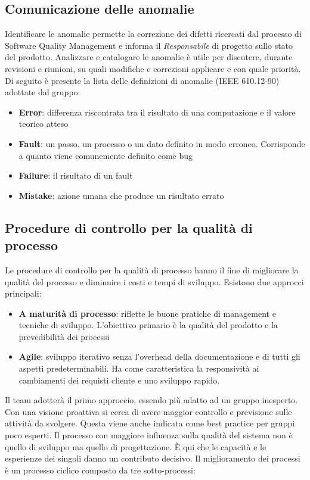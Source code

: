 {  \subsection{Comunicazione delle anomalie}
  Identificare le anomalie permette la correzione dei difetti ricercati
  dal processo di Software Quality  Management e informa il  \emph{Responsabile}
  di  progetto sullo stato del prodotto. Analizzare e
  catalogare le anomalie è utile per discutere, durante revisioni e
  riunioni, su quali modifiche e correzioni applicare e con quale priorità. Di seguito è presente la lista delle definizioni di anomalie
  (IEEE 610.12-90) adottate dal gruppo:
  \begin{itemize}
  \item \textbf{Error}: differenza riscontrata tra il risultato di una computazione e il valore teorico atteso
  \item \textbf{Fault}: un passo, un processo o un dato definito in modo
    erroneo. Corrisponde a quanto viene comunemente definito come bug
  \item \textbf{Failure}: il risultato di un fault
  \item \textbf{Mistake}: azione umana che produce un risultato errato
  \end{itemize}


  \subsection{Procedure di controllo per la qualità di processo}
  Le procedure di controllo per la qualità di processo hanno il fine di migliorare la qualità del
  processo e diminuire i costi e tempi di sviluppo. Esistono due
  approcci principali:
  \begin{itemize}
  \item \textbf{A maturità di processo}: riflette le buone pratiche di management e tecniche di sviluppo.
    L'obiettivo primario è la qualità del prodotto e la prevedibilità dei processi
  \item \textbf{Agile}: sviluppo iterativo senza l’overhead della
    documentazione e di tutti gli aspetti predeterminabili. Ha come
    caratteristica la responsività ai cambiamenti dei requisti cliente e
    uno sviluppo rapido.
  \end{itemize}
  Il team adotterà il primo approccio, essendo più adatto ad un gruppo inesperto. Con una visione
  proattiva si cerca di avere maggior controllo e previsione sulle attività da svolgere. Questa viene
  anche indicata come best practice per gruppi poco esperti.
  Il processo con maggiore influenza sulla qualità del sistema non è quello di sviluppo ma quello
  di progettazione. È qui che le capacità e le esperienze dei singoli danno un contributo decisivo.
  Il miglioramento dei processi è un processo ciclico composto da tre
  sotto-processi:

}
